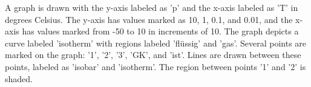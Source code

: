 A graph is drawn with the y-axis labeled as 'p' and the x-axis labeled as 'T' in degrees Celsius. The y-axis has values marked as 10, 1, 0.1, and 0.01, and the x-axis has values marked from -50 to 10 in increments of 10. The graph depicts a curve labeled 'isotherm' with regions labeled 'flüssig' and 'gas'. Several points are marked on the graph: '1', '2', '3', 'GK', and 'ist'. Lines are drawn between these points, labeled as 'isobar' and 'isotherm'. The region between points '1' and '2' is shaded.